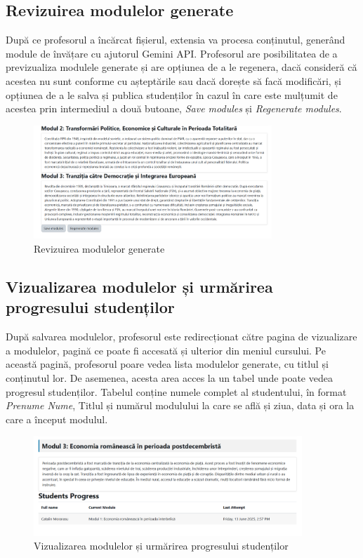 \subsection{Revizuirea modulelor generate}
După ce profesorul a încărcat fișierul, extensia va procesa conținutul, generând module de învățare cu ajutorul Gemini API. Profesorul are posibilitatea de a previzualiza modulele generate 
și are opțiunea de a le regenera, dacă consideră că acestea nu sunt conforme cu așteptările sau dacă dorește să facă modificări, și opțiunea de a le salva și publica studenților în cazul în 
care este mulțumit de acestea prin intermediul a două butoane, \textit{Save modules} și \textit{Regenerate modules}.
\begin{figure}[H]
    \centering
    \includegraphics[width=0.8\textwidth]{images/reviewPage.png}
    \caption{Revizuirea modulelor generate}
    \label{fig:revizuire_module}
\end{figure}

\subsection{Vizualizarea modulelor și urmărirea progresului studenților}
După salvarea modulelor, profesorul este redirecționat către pagina de vizualizare a modulelor, pagină ce poate fi accesată și ulterior din meniul cursului. Pe această pagină, profesorul 
poare vedea lista modulelor generate, cu titlul și conținutul lor. De asemenea, acesta area acces la un tabel unde poate vedea progresul studenților. Tabelul conține numele complet al 
studentului, în format \textit{Prenume Nume}, Titlul și numărul modulului la care se află și ziua, data și ora la care a început modulul.
\begin{figure}[H]
    \centering
    \includegraphics[width=0.9\textwidth]{images/viewProgressPage.png}
    \caption{Vizualizarea modulelor și urmărirea progresului studenților}
    \label{fig:vizualizare_module}
\end{figure}


